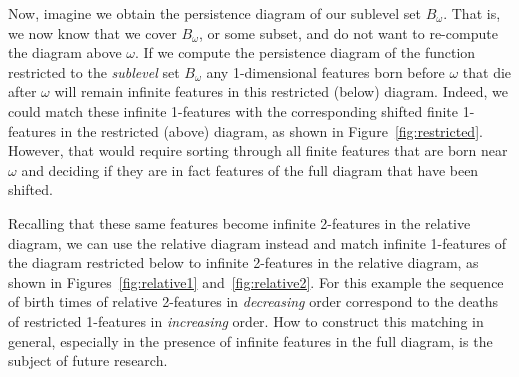 Now, imagine we obtain the persistence diagram of our sublevel set $B_\omega$.
That is, we now know that we cover $B_\omega$, or some subset, and do not want to re-compute the diagram above $\omega$.
If we compute the persistence diagram of the function restricted to the \emph{sublevel} set $B_\omega$ any 1-dimensional features born before $\omega$ that die after $\omega$ will remain infinite features in this restricted (below) diagram.
Indeed, we could match these infinite 1-features with the corresponding shifted finite 1-features in the restricted (above) diagram, as shown in Figure~\ref{fig:restricted}.
However, that would require sorting through all finite features that are born near $\omega$ and deciding if they are in fact features of the full diagram that have been shifted.

Recalling that these same features become infinite 2-features in the relative diagram, we can use the relative diagram instead and match infinite 1-features of the diagram restricted below to infinite 2-features in the relative diagram, as shown in Figures~\ref{fig:relative1} and~\ref{fig:relative2}.
For this example the sequence of birth times of relative 2-features in \emph{decreasing} order correspond to the deaths of restricted 1-features in \emph{increasing} order.
How to construct this matching in general, especially in the presence of infinite features in the full diagram, is the subject of future research.

